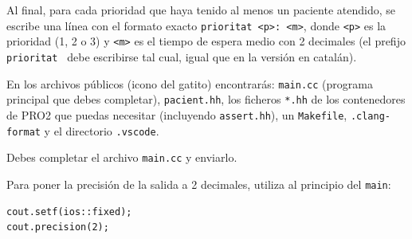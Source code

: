 \medskip

Al final, para cada prioridad que haya tenido al menos un
paciente atendido, se escribe una línea con el formato exacto
\verb|prioritat <p>: <m>|, donde \verb|<p>| es la prioridad (1, 2
o 3) y \verb|<m>| es el tiempo de espera medio con 2 decimales
(el prefijo \verb|prioritat | debe escribirse tal cual, igual que
en la versión en catalán).

\Observation

En los archivos públicos (icono del gatito) encontrarás:
\verb|main.cc| (programa principal que debes completar),
\verb|pacient.hh|, los ficheros \verb|*.hh| de los contenedores de PRO2 que puedas necesitar (incluyendo \verb|assert.hh|), un
\verb|Makefile|, \verb|.clang-format| y el directorio \verb|.vscode|.

\medskip

Debes completar el archivo \verb|main.cc| y enviarlo.

\medskip

Para poner la precisión de la salida a 2 decimales, utiliza al
principio del \verb|main|:

\begin{verbatim}
cout.setf(ios::fixed);
cout.precision(2);
\end{verbatim}

\SampleTwoCol
